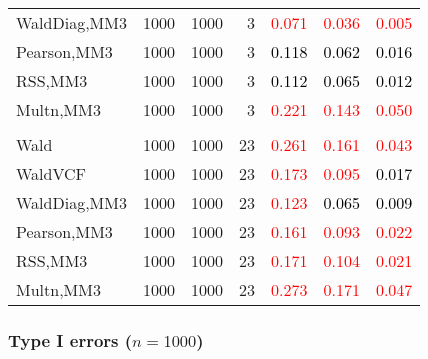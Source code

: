 \documentclass[
]{article}
\begin{document}
\begin{table}[H]
{\begin{tabular}[t]{lrrrrrr}
\hspace{1em}WaldDiag,MM3 & 1000 & 1000 & 3 & \textcolor{red}{0.071} & \textcolor{red}{0.036} & \textcolor{red}{0.005}\\
\hspace{1em}Pearson,MM3 & 1000 & 1000 & 3 & \textcolor{black}{0.118} & \textcolor{black}{0.062} & \textcolor{black}{0.016}\\
\hspace{1em}RSS,MM3 & 1000 & 1000 & 3 & \textcolor{black}{0.112} & \textcolor{black}{0.065} & \textcolor{black}{0.012}\\
\hspace{1em}Multn,MM3 & 1000 & 1000 & 3 & \textcolor{red}{0.221} & \textcolor{red}{0.143} & \textcolor{red}{0.050}\\
\addlinespace[0.3em]
\multicolumn{7}{l}{\textbf{3F 15V}}\\
\hspace{1em}Wald & 1000 & 1000 & 23 & \textcolor{red}{0.261} & \textcolor{red}{0.161} & \textcolor{red}{0.043}\\
\hspace{1em}WaldVCF & 1000 & 1000 & 23 & \textcolor{red}{0.173} & \textcolor{red}{0.095} & \textcolor{black}{0.017}\\
\hspace{1em}WaldDiag,MM3 & 1000 & 1000 & 23 & \textcolor{red}{0.123} & \textcolor{black}{0.065} & \textcolor{black}{0.009}\\
\hspace{1em}Pearson,MM3 & 1000 & 1000 & 23 & \textcolor{red}{0.161} & \textcolor{red}{0.093} & \textcolor{red}{0.022}\\
\hspace{1em}RSS,MM3 & 1000 & 1000 & 23 & \textcolor{red}{0.171} & \textcolor{red}{0.104} & \textcolor{red}{0.021}\\
\hspace{1em}Multn,MM3 & 1000 & 1000 & 23 & \textcolor{red}{0.273} & \textcolor{red}{0.171} & \textcolor{red}{0.047}\\
\bottomrule
\end{tabular}}
\endgroup{}
\end{table}

\hypertarget{type-i-errors-n1000-3}{%
\subsubsection{\texorpdfstring{Type I errors
(\(n=1000\))}{Type I errors (n=1000)}}\label{type-i-errors-n1000-3}}
\end{document}
